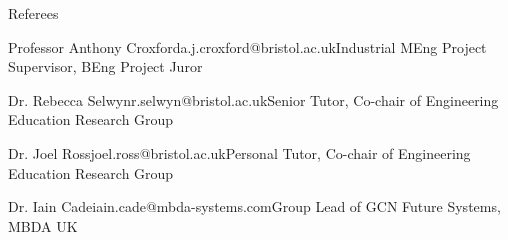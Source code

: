 
\begin{rSection}{Referees}
	\small
    \begin{rSubsection}{Professor Anthony Croxford}{a.j.croxford@bristol.ac.uk}{Industrial MEng Project Supervisor, BEng Project Juror}{}
    \end{rSubsection}
    \begin{rSubsection}{Dr. Rebecca Selwyn}{r.selwyn@bristol.ac.uk}{Senior Tutor, Co-chair of Engineering Education Research Group}{}
    \end{rSubsection}
    \begin{rSubsection}{Dr. Joel Ross}{joel.ross@bristol.ac.uk}{Personal Tutor, Co-chair of Engineering Education Research Group}{}
    \end{rSubsection}
    \begin{rSubsection}{Dr. Iain Cade}{iain.cade@mbda-systems.com}{Group Lead of GCN Future Systems, MBDA UK}{}
    \end{rSubsection}

\end{rSection}